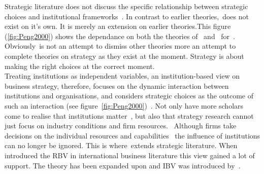 Strategic literature does not discuss the specific relationship between strategic choices and institutional frameworks~\cite{Peng:2008}.
In contrast to earlier theories,~\ibv does not exist on it's own. It is merely an extension on earlier theories.This figure (\ref{fig:Peng2000}) shows the dependance on both the theories of~\cite{Barney:2001} and~\cite{Porter:1980} for~\ibv. 
Obviously~\ibv is not an attempt to dismiss other theories more an attempt to complete theories on strategy as they exist at the moment. 
Strategy is about making the right choices at the correct moment. \\

Treating institutions as independent variables, an institution-based view on business strategy, therefore, focuses on the dynamic interaction between institutions and organisations, and considers strategic choices as the outcome of such an interaction (see figure~\ref{fig:Peng2000})~\cite{Peng:2002}.
Not only have more scholars come to realise that institutions matter~\cite{Powell:1991,Scott:1995}, but also that strategy research cannot just focus on industry conditions and firm resources.~\cite{Khanna:1997}
Although firms take decisions on the individual resources and capabilities~\cite{Barney:1991} the influence of institutions can no longer be ignored. This is where~\ibv extends strategic literature.
When introduced the \gls{RBV} in international business literature this view gained a lot of support. 
The theory has been expanded upon and \gls{IBV} was introduced by~\cite{Kostova:1999,Meyer:2009,Wang:2012}.
\\